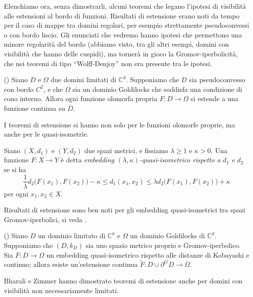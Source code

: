 Elenchiamo ora, senza dimostrarli, alcuni teoremi che legano l'ipotesi di visibilità alle estensioni al bordo di funzioni. Risultati di estensione erano noti da tempo per il caso di mappe tra domini regolari, per esempio strettamente pseudoconvessi o con bordo liscio. Gli enunciati che vedremo hanno ipotesi che permettono una minore regolarità del bordo (abbiamo visto, tra gli altri esempi, domini con visibilità che hanno delle cuspidi), ma tornerà in gioco la Gromov-iperbolicità, che nei teoremi di tipo ``Wolff-Denjoy'' non era presente tra le ipotesi.

\begin{thm}
    (\cite[Theorem 1.5]{BZ1}) Siano $D$ e $\Omega$ due domini limitati di $\mathbb{C}^d$. Supponiamo che $D$ sia pseudoconvesso con bordo $C^2$, e che $\Omega$ sia un dominio Goldilocks che soddisfa una condizione di cono interno. Allora ogni funzione olomorfa propria $F:D\longrightarrow\Omega$ si estende a una funzione continua su $\overline{D}$.
\end{thm}

I teoremi di estensione si hanno non solo per le funzioni olomorfe proprie, ma anche per le quasi-isometrie.

\begin{defn}
    Siano $(X,d_1)$ e $(Y,d_2)$ due spazi metrici, e fissiamo $\lambda\ge 1$ e $\kappa>0$. Una funzione $F:X\longrightarrow Y$ è detta \textit{embedding $(\lambda,\kappa)$-quasi-isometrico rispetto a $d_1$ e $d_2$} se si ha
    $$\frac{1}{\lambda}d_2\big(F(x_1),F(x_2)\big)-\kappa \le d_1(x_1,x_2) \le \lambda d_2\big(F(x_1),F(x_2)\big)+\kappa$$
    per ogni $x_1,x_2\in X$.
\end{defn}

Risultati di estensione sono ben noti per gli embedding quasi-isometrici tra spazi Gromov-iperbolici, si veda \cite[Part III, Chapter H, Theorem 3.9]{BH}.

\begin{thm}
    (\cite[Theorem 1.7]{BZ1}) Siano $D$ un dominio limitato di $\mathbb{C}^k$ e $\Omega$ un dominio Goldilocks di $\mathbb{C}^d$. Supponiamo che $(D,k_D)$ sia uno spazio metrico proprio e Gromov-iperbolico. Sia $F:D\longrightarrow\Omega$ un embedding quasi-isometrico rispetto alle distanze di Kobayashi e continuo; allora esiste un'estensione continua $\tilde{F}:D\cup\partial^GD\longrightarrow\overline{\Omega}$.
\end{thm}

Bharali e Zimmer hanno dimostrato teoremi di estensione anche per domini con visibilità non necessariamente limitati.

